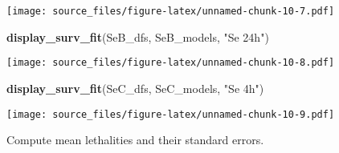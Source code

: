 \documentclass[]{article}
\newenvironment{Shaded}{\begin{snugshade}}{\end{snugshade}}
\newcommand{\KeywordTok}[1]{\textcolor[rgb]{0.13,0.29,0.53}{\textbf{#1}}}
\newcommand{\StringTok}[1]{\textcolor[rgb]{0.31,0.60,0.02}{#1}}
\newcommand{\NormalTok}[1]{#1}
\begin{document}
\texttt{[image: source\_files/figure-latex/unnamed-chunk-10-7.pdf]}

\begin{Shaded}
\begin{Highlighting}[]
\KeywordTok{display_surv_fit}\NormalTok{(SeB_dfs, SeB_models, }\StringTok{"Se 24h"}\NormalTok{)}
\end{Highlighting}
\end{Shaded}

\texttt{[image: source\_files/figure-latex/unnamed-chunk-10-8.pdf]}

\begin{Shaded}
\begin{Highlighting}[]
\KeywordTok{display_surv_fit}\NormalTok{(SeC_dfs, SeC_models, }\StringTok{"Se 4h"}\NormalTok{)}
\end{Highlighting}
\end{Shaded}

\texttt{[image: source\_files/figure-latex/unnamed-chunk-10-9.pdf]}

Compute mean lethalities and their standard errors.
\end{document}
